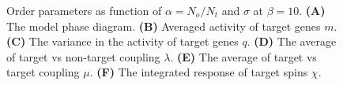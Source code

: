 \documentclass[%
 reprint,
superscriptaddress,
 amsmath,amssymb,
 prl,
]{revtex4-2}
\begin{document}
\begin{figure}[b]
\caption{Order parameters as function of $\alpha = N_o/N_t$ and $\sigma$  at $\beta = 10$. \textbf{(A)}   The model phase diagram. \textbf{(B)} Averaged activity of target genes $m$. \textbf{(C)} The variance in the activity of target genes $q$. \textbf{(D)}  The average of target vs non-target coupling $\lambda$.  \textbf{(E)} The average of target vs target coupling $\mu$. \textbf{(F)} The integrated response  of target spins $\chi$. 
} 
\label{fig:fig3}
\end{figure}



\end{document}
